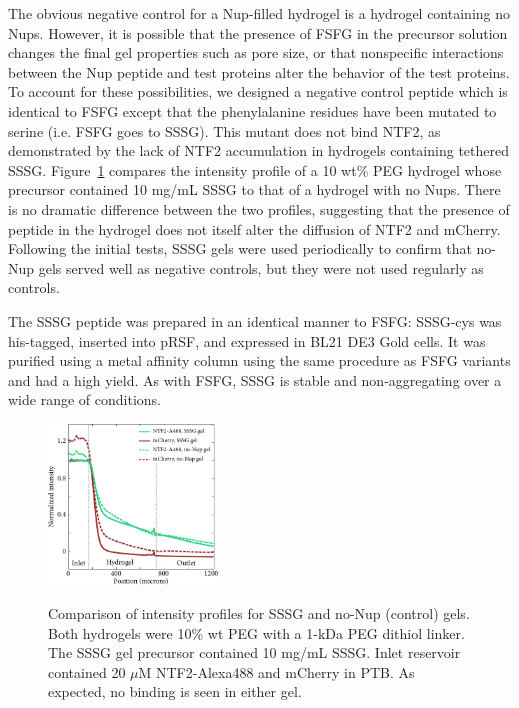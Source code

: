 The obvious negative control for a Nup-filled hydrogel is a hydrogel containing no Nups. However, it is possible that the presence of FSFG in the precursor solution changes the final gel properties such as pore size, or that nonspecific interactions between the Nup peptide and test proteins alter the behavior of the test proteins.  To account for these possibilities, we designed a negative control peptide which is identical to FSFG except that the phenylalanine residues have been mutated to serine (i.e. FSFG goes to SSSG).  This mutant does not bind NTF2, as demonstrated by the lack of NTF2 accumulation in hydrogels containing tethered SSSG. Figure~\ref{fig:SSSG-control-comparison} compares the intensity profile of a 10 wt\% PEG hydrogel whose precursor contained 10 mg/mL SSSG to that of a hydrogel with no Nups.  There is no dramatic difference between the two profiles, suggesting that the presence of peptide in the hydrogel does not itself alter the diffusion of NTF2 and mCherry.  Following the initial tests, SSSG gels were used periodically to confirm that no-Nup gels served well as negative controls, but they were not used regularly as controls.

The SSSG peptide was prepared in an identical manner to FSFG: SSSG-cys was his-tagged, inserted into pRSF, and expressed in BL21 DE3 Gold cells.  It was purified using a metal  affinity column using the same procedure as FSFG variants and had a high yield.  As with FSFG, SSSG is stable and non-aggregating over a wide range of conditions.
\begin{figure} %
\caption[SSSG as a nonbinding Nup.]{Comparison of intensity profiles for SSSG and no-Nup (control) gels. Both hydrogels were 10\% wt PEG with a 1-kDa PEG dithiol linker.  The SSSG gel precursor contained 10 mg/mL SSSG.  Inlet reservoir contained 20 $\mu$M NTF2-Alexa488 and mCherry in PTB.  As expected, no binding is seen in either gel.}
\centering
\includegraphics[width=0.4\textwidth]{figs/ch03/SSSG-control-comparison}
\label{fig:SSSG-control-comparison}
\end{figure} 

